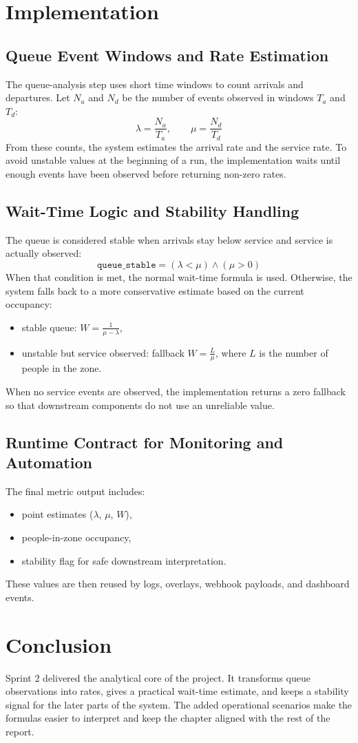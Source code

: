 \section{Implementation}
\subsection{Queue Event Windows and Rate Estimation}
The queue-analysis step uses short time windows to count arrivals and departures. Let $N_a$ and $N_d$ be the number of events observed in windows $T_a$ and $T_d$:
\[
\lambda = \frac{N_a}{T_a}, \qquad \mu = \frac{N_d}{T_d}
\]
From these counts, the system estimates the arrival rate and the service rate. To avoid unstable values at the beginning of a run, the implementation waits until enough events have been observed before returning non-zero rates.

\subsection{Wait-Time Logic and Stability Handling}
The queue is considered stable when arrivals stay below service and service is actually observed:
\[
\texttt{queue\_stable} = (\lambda < \mu) \land (\mu > 0)
\]
When that condition is met, the normal wait-time formula is used. Otherwise, the system falls back to a more conservative estimate based on the current occupancy:
\begin{itemize}
    \item stable queue: $W = \frac{1}{\mu-\lambda}$,
    \item unstable but service observed: fallback $W = \frac{L}{\mu}$, where $L$ is the number of people in the zone.
\end{itemize}
When no service events are observed, the implementation returns a zero fallback so that downstream components do not use an unreliable value.

\subsection{Runtime Contract for Monitoring and Automation}
The final metric output includes:
\begin{itemize}
    \item point estimates ($\lambda$, $\mu$, $W$),
    \item people-in-zone occupancy,
    \item stability flag for safe downstream interpretation.
\end{itemize}
These values are then reused by logs, overlays, webhook payloads, and dashboard events.

\section{Conclusion}
Sprint 2 delivered the analytical core of the project. It transforms queue observations into rates, gives a practical wait-time estimate, and keeps a stability signal for the later parts of the system. The added operational scenarios make the formulas easier to interpret and keep the chapter aligned with the rest of the report.

